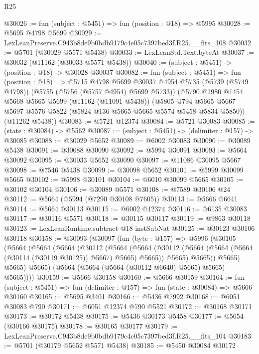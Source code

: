 \begin{lexlean}{R25}
\begin{coremodule}
@30026 := fun (subject : @5451) => fun (position : @18) => @5995
@30028 := @5695 @4798 @5699
@30029 := LexLeanPreserve.C943b8de9b0bdb9179c4e05c7397bed3f.R25.__fits_108
@30032 := @5701 (@30029 @5571 @5438)
@30033 := LexLeanStd.Text.byteAt
@30037 := @30032 (@11162 (@30033 @5571 @5438))
@30040 := (subject : @5451) -> (position : @18) -> @30028 @30037
@30082 := fun (subject : @5451) =>
  fun (position : @18) =>
  @5715
    @4798
    @5699
    @30037
    @4954
    @5735
    (@5739 (@5749 @4798))
    (@5755 (@5756 (@5757 @4954) @5699 @5733))
    (@5790
      @1980
      @1454
      @5668
      @5665
      @5699
      (@11162 (@11091 @5438))
      (@5805 @794 @5665 @5667 @5697 @5576 @5822 (@5824 @136 @5665 @5665 @5574 @5458 @5834 @5850))
      (@11262 @5438))
@30083 := @5721 @12374
@30084 := @5721 @30083
@30085 := (state : @30084) -> @5562
@30087 := (subject : @5451) -> (delimiter : @157) -> @30085
@30088 := @30029 @5652
@30089 := @6002 @30083
@30090 := @30089 @5438
@30091 := @30088 @30090
@30092 := @5994 @30091
@30093 := @5664 @30092
@30095 := @30033 @5652 @30090
@30097 := @11086 @30095 @5667
@30098 := @7546 @5438
@30099 := @30098 @5652
@30101 := @5999 @30099 @5665
@30102 := @5998 @30101
@30104 := @6010 @30099 @5665
@30105 := @30102 @30104
@30106 := @30089 @5571
@30108 := @7589 @30106 @24
@30112 := @5664 (@5994 (@7290 @30108 @7605))
@30113 := @5666 @6641
@30114 := @5664 @30113
@30115 := @6002 @12374
@30116 := @6135 @30083
@30117 := @30116 @5571
@30118 := @30115 @30117
@30119 := @9863 @30118
@30123 := LexLeanRuntime.subtract @18 instSubNat
@30125 := @30123 @30106 @30118
@30158 := @30093
    (@30097
      (fun (byte : @157) =>
      @5996
        (@30105
          (@5664
            (@5664
              (@5664
                (@30112
                  (@5664
                    (@5664
                      (@30112 (@5664 (@5664 (@5664 (@30114 (@30119 @30125)) @5667) @5665) @5665))
                      @5665)
                    @5665))
                @5665)
              @5665)
            @5665)
          (@5664 (@5664 (@5664 (@30112 @6640) @5665) @5665) @5665))))
@30159 := @5666 @30158
@30160 := @5666 @30159
@30164 := fun (subject : @5451) => fun (delimiter : @157) => fun (state : @30084) => @5666 @30160
@30165 := @5695 @3401
@30166 := @5436 @7992
@30168 := @6051 @30083 @790
@30171 := @6051 @12374 @790 @5521
@30172 := @30168 @30171
@30173 := @30172 @5438
@30175 := @5436 @30173 @5458
@30177 := @5654 (@30166 @30175)
@30178 := @30165 @30177
@30179 := LexLeanPreserve.C943b8de9b0bdb9179c4e05c7397bed3f.R25.__fits_104
@30183 := @5701 (@30179 @5652 @5571 @5438)
@30185 := @5450 @30084 @30172

\end{coremodule}
\end{lexlean}
